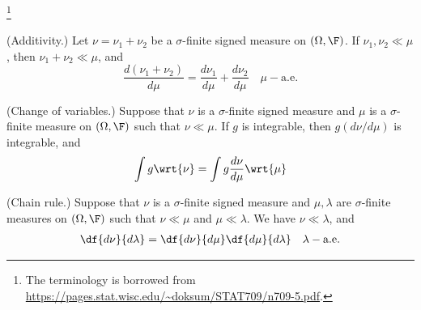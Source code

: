 \documentclass{article} %
\begin{document}

\begin{proposition}{}\footnote{The terminology is borrowed from \url{https://pages.stat.wisc.edu/~doksum/STAT709/n709-5.pdf}.}
\begin{alphabate}
\item \textnormal{(Additivity.)} Let $\nu = \nu_1 + \nu_2$ be a $\sigma$-finite signed measure on $(\Omega,\F)$.  If $\nu_1, \nu_2 \ll \mu$, then $\nu_1 + \nu_2 \ll \mu$, and 
\[ \frac{d(\nu_1+\nu_2)}{d\mu} = \frac{d\nu_1}{d\mu} + \frac{d\nu_2}{d\mu} \quad \mu-\text{a.e.} \] 
\item \textnormal{(Change of variables.)} Suppose that $\nu$ is a $\sigma$-finite signed measure and $\mu$ is a  $\sigma$-finite measure on $(\Omega, \F)$ such that $\nu \ll \mu$. If $g$ is integrable, then $g(d\nu/d\mu)$ is integrable, and 
\[ \int g \wrt{\nu} = \int g \frac{d\nu}{d\mu} \wrt{\mu} \]
\item \textnormal{(Chain rule.)} Suppose that $\nu$ is a $\sigma$-finite signed measure and $\mu, \lambda$ are $\sigma$-finite measures on $(\Omega, \F)$ such that $\nu \ll \mu$ and $\mu \ll \lambda$. We have $\nu \ll \lambda$, and 
\begin{align}
 \df{d\nu}{d\lambda} = \df{d\nu}{d\mu}  \df{d\mu}{d\lambda} \quad \lambda-\text{a.e.} 
 \label{eqn:chain_rule}
\end{align}

\end{alphabate}
\label{prop:calculus_with_radon_nikodym_derivatives}
\end{proposition}
\end{document}
